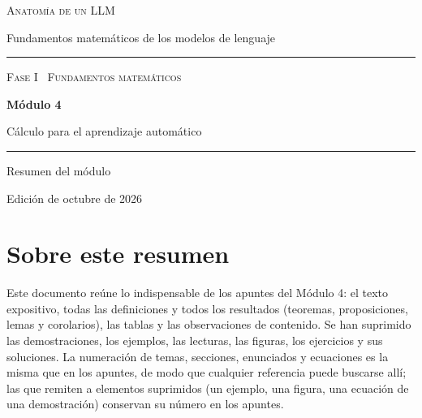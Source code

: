\documentclass[11pt,a4paper,twoside,openany]{book}
\begin{document}
\frontmatter
\begin{titlepage}
\centering
\vspace*{2.5cm}
{\large\scshape Anatomía de un LLM}\par
\vspace{0.4cm}
{\normalsize Fundamentos matemáticos de los modelos de lenguaje}\par
\vspace{2.2cm}
\rule{\textwidth}{0.8pt}\par\vspace{0.5cm}
{\small\scshape Fase I \textperiodcentered\ Fundamentos matemáticos}\par\vspace{0.3cm}
{\Huge\bfseries Módulo 4\par}\vspace{0.3cm}
{\LARGE Cálculo para el aprendizaje automático\par}
\vspace{0.5cm}\rule{\textwidth}{0.4pt}\par
\vspace{1.6cm}
{\large Resumen del módulo}\par
\vfill
{\small Edición de octubre de 2026}\par
\end{titlepage}

\chapter*{Sobre este resumen}

Este documento reúne lo indispensable de los apuntes del Módulo 4: el texto expositivo, todas las definiciones y todos los resultados (teoremas, proposiciones, lemas y corolarios), las tablas y las observaciones de contenido. Se han suprimido las demostraciones, los ejemplos, las lecturas, las figuras, los ejercicios y sus soluciones. La numeración de temas, secciones, enunciados y ecuaciones es la misma que en los apuntes, de modo que cualquier referencia puede buscarse allí; las que remiten a elementos suprimidos (un ejemplo, una figura, una ecuación de una demostración) conservan su número en los apuntes.
\end{document}
